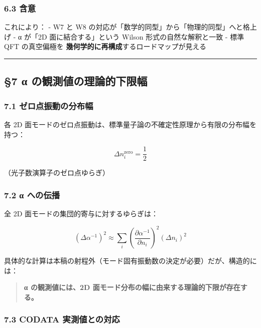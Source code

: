 \documentclass[
  11pt]{ltjsarticle}
\begin{document}
\subsubsection{6.3 含意}\label{ux542bux610f}

これにより： - W7 と W8
の対応が「数学的同型」から「物理的同型」へと格上げ - α が「2D
面に結合する」という Wilson 形式の自然な解釈と一致 - 標準 QFT
の真空偏極を \textbf{幾何学的に再構成}するロードマップが見える

\begin{center}\rule{0.5\linewidth}{0.5pt}\end{center}

\subsection{§7 α
の観測値の理論的下限幅}\label{ux3b1-ux306eux89b3ux6e2cux5024ux306eux7406ux8ad6ux7684ux4e0bux9650ux5e45}

\subsubsection{7.1
ゼロ点振動の分布幅}\label{ux30bcux30edux70b9ux632fux52d5ux306eux5206ux5e03ux5e45}

各 2D
面モードのゼロ点振動は、標準量子論の不確定性原理から有限の分布幅を持つ：

\[\Delta n_i^{\text{zero}} = \frac{1}{2}\]

（光子数演算子のゼロ点ゆらぎ）

\subsubsection{7.2 α への伝播}\label{ux3b1-ux3078ux306eux4f1dux64ad}

全 2D 面モードの集団的寄与に対するゆらぎは：

\[(\Delta \alpha^{-1})^2 \approx \sum_i \left(\frac{\partial \alpha^{-1}}{\partial n_i}\right)^2 (\Delta n_i)^2\]

具体的な計算は本稿の射程外（モード固有振動数の決定が必要）だが、構造的には：

\begin{quote}
\textbf{α の観測値には、2D
面モード分布の幅に由来する理論的下限が存在する。}
\end{quote}

\subsubsection{7.3 CODATA
実測値との対応}\label{codata-ux5b9fux6e2cux5024ux3068ux306eux5bfeux5fdc}
\end{document}

